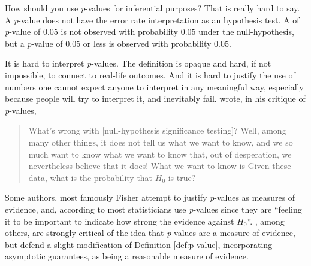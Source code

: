How should you use \emph{p}-values for inferential purposes? That is really hard to say. A \emph{p}-value does not have the error rate interpretation as an hypothesis test. A of \textit{p}-value of $0.05$ is not observed with probability $0.05$ under the null-hypothesis, but a \emph{p}-value of $0.05$ or less is observed with probability $0.05$. 

It is hard to interpret \emph{p}-values. The definition is opaque and hard, if not impossible, to connect to real-life outcomes. And it is hard to justify the use of numbers one cannot expect anyone to interpret in any meaningful way, especially because people will try to interpret it, and inevitably fail. \textcite{Cohen1994-au} wrote, in his critique of \emph{p}-values, 
\begin{quotation}
What's wrong with {[}null-hypothesis significance testing{]}? Well, among many other things, it does not tell us what we want to know, and we so much want to know what we want to know that, out of desperation, we nevertheless believe that it does! What we want to know is \textquotedbl Given these data, what is the probability that $H_{0}$ is true?\textquotedbl{}
\end{quotation}
Some authors, most famously Fisher \parencite{Liu2020-er} attempt to justify \emph{p}-values
as measures of evidence, and, according to \textcite{Berger1987-tf}
most statisticians use \emph{p}-values since they are ``feeling it
to be important to indicate how strong the evidence against $H_{0}$''.
\textcite{Hubbard2008-cg}, among others, are strongly critical of the
idea that \emph{p}-values are a measure of evidence, but \textcite{Liu2020-er} defend a slight modification of Definition \ref{def:p-value}, incorporating asymptotic guarantees, as being a reasonable measure of evidence.

